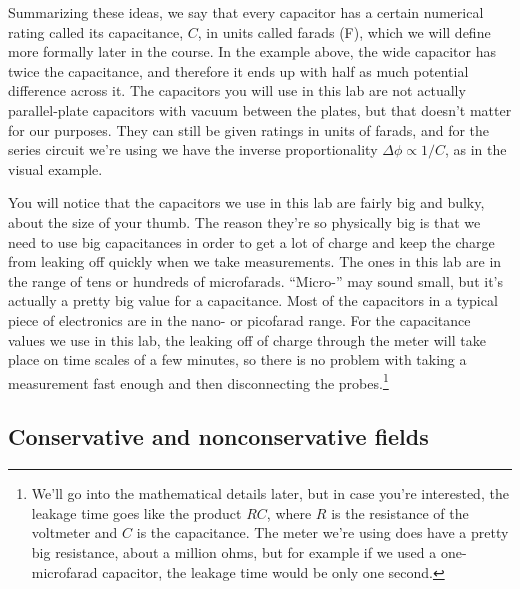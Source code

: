 Summarizing these ideas, we say that every capacitor has a certain numerical
rating called its capacitance, $C$, in units called farads (F), which we will
define more formally later in the course. In the example above, the wide
capacitor has twice the capacitance, and therefore it ends up with half as much potential difference across it. The capacitors you will 
use in this lab are not actually parallel-plate capacitors with vacuum
between the plates, but that doesn't matter for our purposes. They can
still be given ratings in units of farads, and for the series circuit we're using
we have the inverse proportionality $\Delta\phi\propto 1/C$, as in the visual example.

You will notice that the capacitors we use in this lab are fairly big
and bulky, about the size of your thumb. The reason they're so physically
big is that we need to use big capacitances in order to get a lot of charge and keep the charge
from leaking off quickly when we take measurements. The ones in this lab are in the range of tens or hundreds
of microfarads. ``Micro-'' may sound small, but it's actually a pretty
big value for a capacitance. Most of the capacitors in a typical piece
of electronics are in the nano- or picofarad range. For
the capacitance values we use in this lab, the leaking off of charge through the meter will take place on time scales of a few
minutes, so there is no problem with taking a measurement fast enough
and then disconnecting the probes.\footnote{We'll go into the mathematical
details later, but in case you're interested, the leakage time goes like
the product $RC$, where $R$ is the resistance of the voltmeter and $C$ is
the capacitance. The meter we're using does have a pretty big resistance,
about a million ohms, but for example if we used a one-microfarad
capacitor, the leakage time would be only one second.}


\subsection*{Conservative and nonconservative fields}


